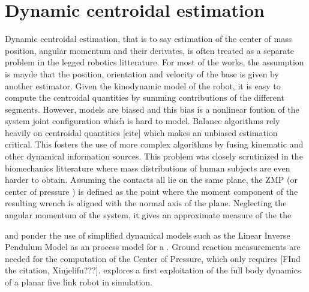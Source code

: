 \section{Dynamic centroidal estimation}
Dynamic centroidal estimation, that is to say estimation of the center of mass position, angular momentum and their derivates, is often treated as a separate problem in 
the legged robotics litterature. For most of the works, the assumption is mayde that the position, orientation and velocity of the base is given by another 
estimator. Given the kinodynamic model of the robot, it is easy to compute the centroidal quantities by summing contributions of the different segments. However,
models are biased and this bias is a nonlinear fontion of the system joint configuration which is hard to model. Balance algorithms rely heavily on centroidal quantities [cite] which makes 
an unbiased estimation critical. This fosters the use of more complex algorithms by fusing kinematic and other dynamical information sources.
This problem was closely scrutinized in the biomechanics litterature where mass distributions of human subjects are even harder to obtain. 
Assuming the contacts all lie on the same plane, the ZMP (or center of pressure \cite{sardain2004forces}) is defined as the point
where the moment component of the resulting wrench is aligned with the normal axis of the plane. Neglecting the angular momentum of the system, it gives an approximate measure of the
the  

\cite{stephens2011state} and \cite{atkeson2012state} ponder the use of simplified dynamical models 
such as the Linear Inverse Pendulum Model as an process model for a \KalmanF. Ground reaction measurements are needed for the computation of the Center of Pressure, which only requires [FInd the citation, Xinjelifu???].
\cite{atkeson2012state} explores a first exploitation of the full body dynamics of a planar five link robot in simulation.



\cite{stephens2011state}
\cite{atkeson2012state}
\cite{rotella2015humanoid}
\cite{xinjilefu2015center}
\cite{carpentier2016center}
\cite{benallegue2018model}
\cite{piperakis2018nonlinear}
\cite{bailly2019recursive}
\cite{hawley2019external}
\cite{bailly2021optimal}

